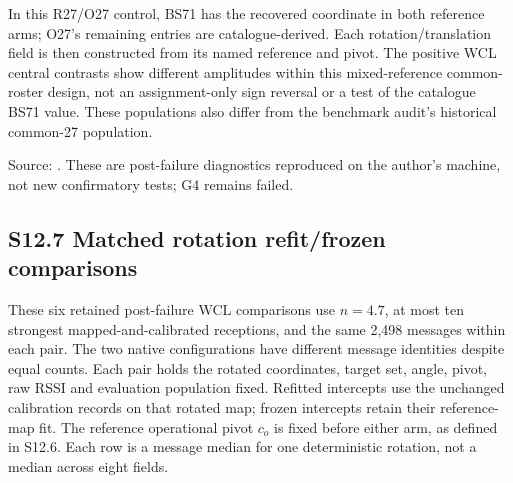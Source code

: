 \documentclass[journal,onecolumn,10pt]{IEEEtran}
\begin{document}
In this R27/O27 control, BS71 has the recovered coordinate in both reference arms; O27's remaining entries are catalogue-derived. Each rotation/translation field is then constructed from its named reference and pivot. The positive WCL central contrasts show different amplitudes within this mixed-reference common-roster design, not an assignment-only sign reversal or a test of the catalogue BS71 value. These populations also differ from the benchmark audit's historical common-27 population.

Source: . These are post-failure diagnostics reproduced on the author's machine, not new confirmatory tests; G4 remains failed.

\subsection*{S12.7 Matched rotation refit/frozen comparisons}\label{s12.7-rotation-refitting}
These six retained post-failure WCL comparisons use $n=4.7$, at most ten strongest mapped-and-calibrated receptions, and the same 2,498 messages within each pair. The two native configurations have different message identities despite equal counts. Each pair holds the rotated coordinates, target set, angle, pivot, raw RSSI and evaluation population fixed. Refitted intercepts use the unchanged calibration records on that rotated map; frozen intercepts retain their reference-map fit. The reference operational pivot $c_o$ is fixed before either arm, as defined in S12.6. Each row is a message median for one deterministic rotation, not a median across eight fields.
\end{document}
